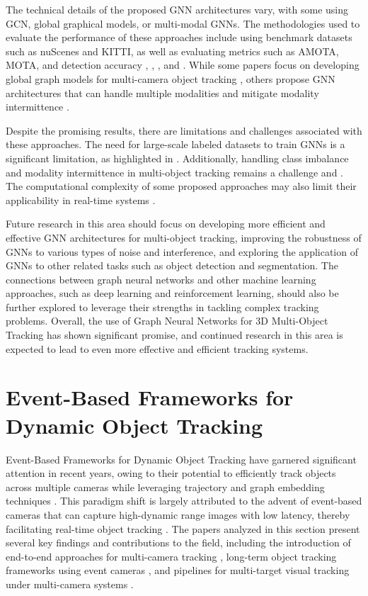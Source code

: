 \documentclass[conference]{IEEEtran}
\begin{document}
The technical details of the proposed GNN architectures vary, with some using GCN, global graphical models, or multi-modal GNNs. The methodologies used to evaluate the performance of these approaches include using benchmark datasets such as nuScenes and KITTI, as well as evaluating metrics such as AMOTA, MOTA, and detection accuracy \cite{Title of paper 1}, \cite{Title of paper 3}, \cite{Title of paper 4}, and \cite{Title of paper 5}. While some papers focus on developing global graph models for multi-camera object tracking \cite{Title of paper 2}, others propose GNN architectures that can handle multiple modalities and mitigate modality intermittence \cite{Title of paper 3}.

Despite the promising results, there are limitations and challenges associated with these approaches. The need for large-scale labeled datasets to train GNNs is a significant limitation, as highlighted in \cite{Title of paper 3}. Additionally, handling class imbalance and modality intermittence in multi-object tracking remains a challenge \cite{Title of paper 1} and \cite{Title of paper 3}. The computational complexity of some proposed approaches may also limit their applicability in real-time systems \cite{Title of paper 4}.

Future research in this area should focus on developing more efficient and effective GNN architectures for multi-object tracking, improving the robustness of GNNs to various types of noise and interference, and exploring the application of GNNs to other related tasks such as object detection and segmentation. The connections between graph neural networks and other machine learning approaches, such as deep learning and reinforcement learning, should also be further explored to leverage their strengths in tackling complex tracking problems. Overall, the use of Graph Neural Networks for 3D Multi-Object Tracking has shown significant promise, and continued research in this area is expected to lead to even more effective and efficient tracking systems.

\section{Event-Based Frameworks for Dynamic Object Tracking}
Event-Based Frameworks for Dynamic Object Tracking have garnered significant attention in recent years, owing to their potential to efficiently track objects across multiple cameras while leveraging trajectory and graph embedding techniques \cite{MCTR: Multi-Camera Tracking Transformer}. This paradigm shift is largely attributed to the advent of event-based cameras that can capture high-dynamic range images with low latency, thereby facilitating real-time object tracking \cite{e-TLD: Event-based Framework for Dynamic Object Tracking}. The papers analyzed in this section present several key findings and contributions to the field, including the introduction of end-to-end approaches for multi-camera tracking \cite{MCTR: Multi-Camera Tracking Transformer}, long-term object tracking frameworks using event cameras \cite{e-TLD: Event-based Framework for Dynamic Object Tracking}, and pipelines for multi-target visual tracking under multi-camera systems \cite{Multi-camera Multi-Object Tracking}.
\end{document}
